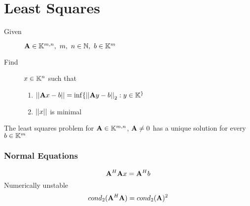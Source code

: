\part{Least Squares}

\begin{description}
	\item[Given] $\mathbf{A} \in\mathbb{K}^{m,n},\ m,\ n \in \mathbb{N},\ b \in \mathbb{K}^m$
	\item[Find] $x \in \mathbb{K}^n$ such that
		\begin{enumerate}
			\item $\left|\left| \mathbf{A} x - b \right|\right| = \inf \{\left|\left| \mathbf{A} y - b \right|\right|_2 : y \in \mathbb{K}^\}$
			\item $\left|\left| x \right|\right|$ is minimal
		\end{enumerate}
\end{description}

\begin{lemma}
	The least squares problem for $\mathbf{A} \in \mathbb{K}^{m,n}$, $\mathbf{A} \neq 0$ has a unique solution for every $b \in \mathbb{K}^m$
\end{lemma}

\section{Normal Equations}
	\[
		\mathbf{A}^H \mathbf{A}x = \mathbf{A}^H b
	\]
	Numerically unstable
	\[
		cond_2(\mathbf{A}^H \mathbf{A}) = cond_2(\mathbf{A})^2
	\]



